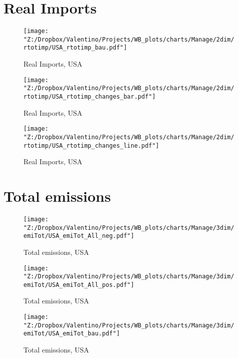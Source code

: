 \documentclass[12pt, letterpaper]{article}
\begin{document}
\newpage
\section{Real Imports}
\begin{figure}[H]
\caption{Real Imports, USA}
\label{fig_USA_rtotimp_bau}
\centering
\texttt{[image: "Z:/Dropbox/Valentino/Projects/WB\_plots/charts/Manage/2dim/rtotimp/USA\_rtotimp\_bau.pdf"]}
\end{figure}
\begin{figure}[H]
\caption{Real Imports, USA}
\label{fig_USA_rtotimp_changes_bar}
\centering
\texttt{[image: "Z:/Dropbox/Valentino/Projects/WB\_plots/charts/Manage/2dim/rtotimp/USA\_rtotimp\_changes\_bar.pdf"]}
\end{figure}
\begin{figure}[H]
\caption{Real Imports, USA}
\label{fig_USA_rtotimp_changes_line}
\centering
\texttt{[image: "Z:/Dropbox/Valentino/Projects/WB\_plots/charts/Manage/2dim/rtotimp/USA\_rtotimp\_changes\_line.pdf"]}
\end{figure}

\newpage
\section{Total emissions}
\begin{figure}[H]
\caption{Total emissions, USA}
\label{fig_USA_emiTot_All_neg}
\centering
\texttt{[image: "Z:/Dropbox/Valentino/Projects/WB\_plots/charts/Manage/3dim/emiTot/USA\_emiTot\_All\_neg.pdf"]}
\end{figure}
\begin{figure}[H]
\caption{Total emissions, USA}
\label{fig_USA_emiTot_All_pos}
\centering
\texttt{[image: "Z:/Dropbox/Valentino/Projects/WB\_plots/charts/Manage/3dim/emiTot/USA\_emiTot\_All\_pos.pdf"]}
\end{figure}
\begin{figure}[H]
\caption{Total emissions, USA}
\label{fig_USA_emiTot_bau}
\centering
\texttt{[image: "Z:/Dropbox/Valentino/Projects/WB\_plots/charts/Manage/3dim/emiTot/USA\_emiTot\_bau.pdf"]}
\end{figure}
\end{document}
